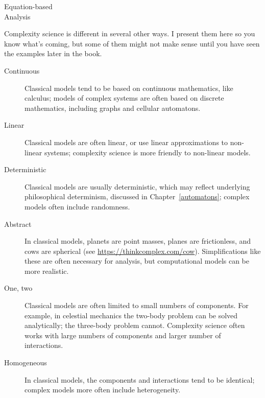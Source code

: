 \documentclass[12pt]{book}
\theoremstyle{exercise}
\newcommand{\myrightarrow}{\ensuremath \rightarrow}
\begin{document}
\begin{description}

\item[Equation-based \myrightarrow~simulation-based] \quad

\item[Analysis \myrightarrow~computation] \quad

\end{description}

Complexity science is different in several other ways.  I present them
here so you know what's coming, but some of them might not make sense
until you have seen the examples later in the book.

\begin{description}

\item[Continuous \myrightarrow~discrete] Classical models tend to be
  based on continuous mathematics, like calculus; models of complex
  systems are often based on discrete mathematics, including graphs and
  cellular automatons.


\item[Linear \myrightarrow~non-linear] Classical models are often
  linear, or use linear approximations to non-linear systems;
  complexity science is more friendly to non-linear models.


\item[Deterministic \myrightarrow~stochastic] Classical models are
  usually deterministic, which may reflect underlying philosophical
  determinism, discussed in Chapter~\ref{automatons}; complex models
  often include randomness.


\item[Abstract \myrightarrow~detailed] In classical models, planets are
  point masses, planes are frictionless, and cows are
  spherical (see \url{https://thinkcomplex.com/cow}).
  Simplifications like these are often necessary for analysis,
  but computational models can be more realistic.


\item[One, two \myrightarrow~many] Classical models are often limited to
  small numbers of components.  For example, in celestial mechanics the
  two-body problem can be solved analytically; the three-body problem
  cannot.  Complexity science often works with large numbers of components and larger number of interactions.


\item[Homogeneous \myrightarrow~heterogeneous] In classical models, the
  components and interactions tend to be identical; complex models more often
  include heterogeneity.


\end{description}
\end{document}
